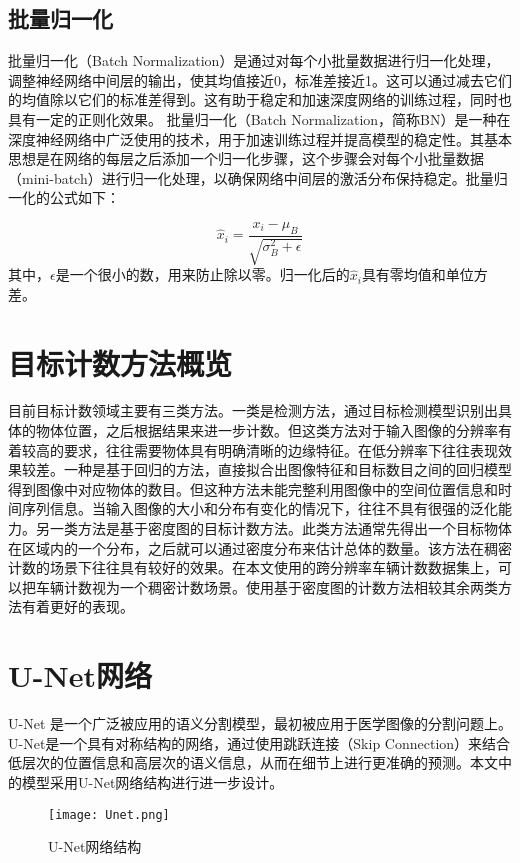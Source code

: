 \subsection{批量归一化}
批量归一化（Batch Normalization）\cite{bjorck2018understanding}是通过对每个小批量数据进行归一化处理，调整神经网络中间层的输出，使其均值接近0，标准差接近1。这可以通过减去它们的均值除以它们的标准差得到。这有助于稳定和加速深度网络的训练过程，同时也具有一定的正则化效果。
批量归一化（Batch Normalization，简称BN）是一种在深度神经网络中广泛使用的技术，用于加速训练过程并提高模型的稳定性。其基本思想是在网络的每层之后添加一个归一化步骤，这个步骤会对每个小批量数据（mini-batch）进行归一化处理，以确保网络中间层的激活分布保持稳定。批量归一化的公式如下：

\begin{equation}
  \hat{x}_i = \frac{x_i - \mu_B}{\sqrt{\sigma_B^2 + \epsilon}} 
\end{equation}
其中，$\epsilon$是一个很小的数，用来防止除以零。归一化后的\(\hat{x}_i\)具有零均值和单位方差。


\section{目标计数方法概览}
目前目标计数领域主要有三类方法。一类是检测方法\cite{girshick2014rich,girshick2015fast,ren2015faster,redmon2016you,redmon2017yolo9000,he2017mask}，通过目标检测模型识别出具体的物体位置，之后根据结果来进一步计数。但这类方法对于输入图像的分辨率有着较高的要求，往往需要物体具有明确清晰的边缘特征。在低分辨率下往往表现效果较差。一种是基于回归的方法\cite{2009BayesianPoissonRegressionCrowdCounting,2013MultisourceMultiscaleCountingExtremelyDenseCrowdImages,2009CrowdCountingUsingMultipleLocalFeatures}，直接拟合出图像特征和目标数目之间的回归模型得到图像中对应物体的数目。但这种方法未能完整利用图像中的空间位置信息和时间序列信息。当输入图像的大小和分布有变化的情况下，往往不具有很强的泛化能力。另一类方法是基于密度图的目标计数方法\cite{li2018csrnet,2016SingleImageCrowdCountingMultiColumnConvolutionalNeuralNetwork,2018CrowdCountingusingDeepRecurrentSpatialAwareNetwork,2018VehicleDetectionCountingHighResolutionAerialImagesUsingConvolutionalRegressionNeuralNetwork}。此类方法通常先得出一个目标物体在区域内的一个分布，之后就可以通过密度分布来估计总体的数量。该方法在稠密计数的场景下往往具有较好的效果。在本文使用的跨分辨率车辆计数数据集上，可以把车辆计数视为一个稠密计数场景。使用基于密度图的计数方法相较其余两类方法有着更好的表现。


\section{U-Net网络}
U-Net
\cite{cheng2021transfer}是一个广泛被应用的语义分割模型，最初被应用于医学图像的分割问题上。U-Net是一个具有对称结构的网络，通过使用跳跃连接（Skip Connection）来结合低层次的位置信息和高层次的语义信息，从而在细节上进行更准确的预测。本文中的模型采用U-Net网络结构进行进一步设计。
\begin{figure}[h]
  \centering
  \texttt{[image: Unet.png]}
  \caption{U-Net网络结构}
  \label{fig:UNet}
\end{figure}
